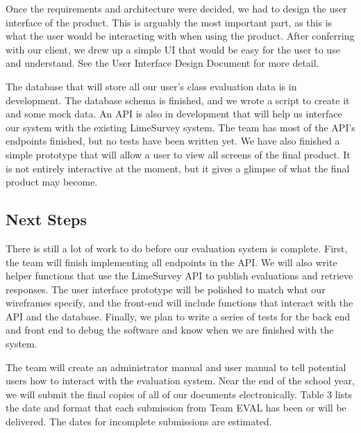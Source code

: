\documentclass{article}
\begin{document}
Once the requirements and architecture were decided, we had to design the user interface of the product. This is arguably the most important part, as this is what the user would be interacting with when using the product. After conferring with our client, we drew up a simple UI that would be easy for the user to use and understand. See the User Interface Design Document for more detail.

The database that will store all our user's class evaluation data is in development. The database schema is finished, and we wrote a script to create it and some mock data. An API is also in development that will help us interface our system with the existing LimeSurvey system. The team has most of the API's endpoints finished, but no tests have been written yet. We have also finished a simple prototype that will allow a user to view all screens of the final product. It is not entirely interactive at the moment, but it gives a glimpse of what the final product may become.

\subsection{Next Steps}

There is still a lot of work to do before our evaluation system is complete. First, the team will finish implementing all endpoints in the API. We will also write helper functions that use the LimeSurvey API to publish evaluations and retrieve responses. The user interface prototype will be polished to match what our wireframes specify, and the front-end will include functions that interact with the API and the database. Finally, we plan to write a series of tests for the back end and front end to debug the software and know when we are finished with the system.

The team will create an administrator manual and user manual to tell potential users how to interact with the evaluation system. Near the end of the school year, we will submit the final copies of all of our documents electronically. Table 3 lists the date and format that each submission from Team EVAL has been or will be delivered. The dates for incomplete submissions are estimated.
\newpage
\end{document}
